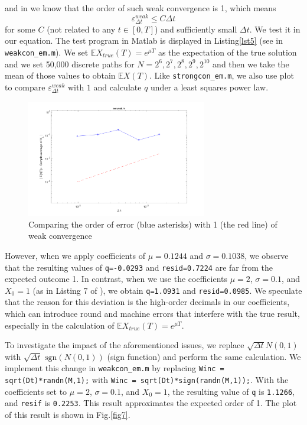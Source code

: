 \documentclass[12pt,a4paper]{article}
\theoremstyle{definition}
\begin{document}
and in \cite{bayram} we know that the order of such weak convergence is 1, which means\begin{equation}
    \label{weakem2} \varepsilon_{\Delta t}^{weak} \le C\Delta t
\end{equation}
for some $C$ (not related to any $t\in [0,T]$) and sufficiently small $\Delta t$. We test it in our equation. The test program in Matlab is displayed in Listing\ref{lst5} (see in \verb|weakcon_em.m|). We set $\mathbb{E}X_{true}(T)=e^{\mu T}$ as the expectation of the true solution and we set 50,000 discrete paths for $N=2^6,2^7,2^8,2^9,2^{10}$ and then we take the mean of those values to obtain $\mathbb{E}X(T)$. Like \verb|strongcon_em.m|, we also use plot to compare $\varepsilon_{\Delta t}^{weak}$ with $1$ and calculate $q$ under a least squares power law. 

\begin{figure}[htbp]
\centering
\includegraphics[width=0.7\textwidth]{fig/fig6.png}
\caption{\label{fig6} Comparing the order of error (blue asterisks) with 1 (the red line) of weak convergence  }
\end{figure}

However, when we apply coefficients of $\mu=0.1244$ and $\sigma=0.1038$, we observe that the resulting values of \verb|q=-0.0293| and \verb|resid=0.7224| are far from the expected outcome 1. In contrast, when we use the coefficients $\mu=2$, $\sigma=0.1$, and $X_0=1$ (as in Listing 7 of \cite{higham._2001}), we obtain \verb|q=1.0931| and \verb|resid=0.0985|. We speculate that the reason for this deviation is the high-order decimals in our coefficients, which can introduce round and machine errors that interfere with the true result, especially in the calculation of $\mathbb{E}X_{true}(T)=e^{\mu T}$.

To investigate the impact of the aforementioned issues, we replace $\sqrt{\Delta t}N(0,1)$ with $\sqrt{\Delta t}\text{ sgn}(N(0,1))$ (sign function) and perform the same calculation. We implement this change in \verb|weakcon_em.m| by replacing \lstinline{Winc = sqrt(Dt)*randn(M,1);} with \lstinline{Winc = sqrt(Dt)*sign(randn(M,1));}. With the coefficients set to $\mu=2$, $\sigma=0.1$, and $X_0=1$, the resulting value of \verb|q| is \verb|1.1266|, and \verb|resif| is \verb|0.2253|. This result approximates the expected order of 1. The plot of this result is shown in Fig.\ref{fig7}.
\end{document}
